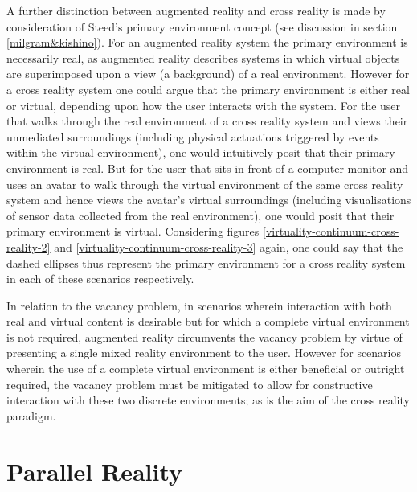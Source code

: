 A further distinction between augmented reality and cross reality is made by consideration of Steed's primary environment concept (see discussion in section \ref{milgram&kishino}). For an augmented reality system the primary environment is necessarily real, as augmented reality describes systems in which virtual objects are superimposed upon a view (a background) of a real environment. However for a cross reality system one could argue that the primary environment is either real or virtual, depending upon how the user interacts with the system. For the user that walks through the real environment of a cross reality system and views their unmediated surroundings (including physical actuations triggered by events within the virtual environment), one would intuitively posit that their primary environment is real. But for the user that sits in front of a computer monitor and uses an avatar to walk through the virtual environment of the same cross reality system and hence views the avatar's virtual surroundings (including visualisations of sensor data collected from the real environment), one would posit that their primary environment is virtual. Considering figures \ref{virtuality-continuum-cross-reality-2} and \ref{virtuality-continuum-cross-reality-3} again, one could say that the dashed ellipses thus represent the primary environment for a cross reality system in each of these scenarios respectively.

In relation to the vacancy problem, in scenarios wherein interaction with both real and virtual content is desirable but for which a complete virtual environment is not required, augmented reality circumvents the vacancy problem by virtue of presenting a single mixed reality environment to the user. However for scenarios wherein the use of a complete virtual environment is either beneficial or outright required, the vacancy problem must be mitigated to allow for constructive interaction with these two discrete environments; as is the aim of the cross reality paradigm.


\section{Parallel Reality}
\label{parallelrealityinbackground}
\newcommand{\PRfootnote}{\footnote{Note that the use of `PR' in the quotation in section \ref{subsec_HyperReality} is a reference to `physical reality' (that author's term for what this thesis simply calls `reality') and is not a reference to parallel reality.}}

